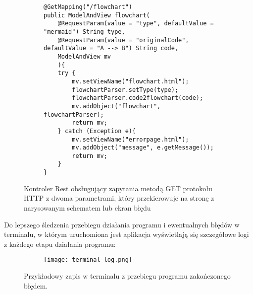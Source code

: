 \begin{figure}[H]
	\begin{subfigure}{\textwidth}
			\begin{verbatim}
@GetMapping("/flowchart")
public ModelAndView flowchart(
    @RequestParam(value = "type", defaultValue = "mermaid") String type,
    @RequestParam(value = "originalCode", defaultValue = "A --> B") String code,
    ModelAndView mv
    ){
    try {
        mv.setViewName("flowchart.html");
        flowchartParser.setType(type);
        flowchartParser.code2flowchart(code);
        mv.addObject("flowchart", flowchartParser);
        return mv;
    } catch (Exception e){
        mv.setViewName("errorpage.html");
        mv.addObject("message", e.getMessage());
        return mv;
    }
}
			\end{verbatim}
	\end{subfigure}\hfill
  	\caption{Kontroler Rest obsługujący zapytania metodą GET protokołu HTTP z dwoma parametrami, który przekierowuje na stronę z narysowanym schematem lub ekran błędu }
\end{figure}

\bigbreak
	Do lepszego śledzenia przebiegu działania programu i ewentualnych błędów w terminalu, w którym uruchomiona jest aplikacja wyświetlają się szczegółowe logi z każdego etapu działania programu:	
		
				\begin{figure}[H]
  \begin{subfigure}{\textwidth}
    \texttt{[image: terminal-log.png]}
  \end{subfigure}\hfill
  \caption{Przykładowy zapis w terminalu z przebiegu programu zakończonego błędem. }
\end{figure}
	

